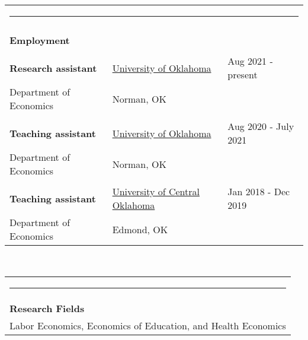 \documentclass[10pt,letterpaper]{article}
\begin{document}
\begin{tabular}{p{2.75in}p{3.05in}p{4.0in}}
\multicolumn{3}{p{7.5in}}{\hrule}\\
\\
{\textbf{\large{Employment}}} & &\\
\\
\textbf{Research assistant} & \href{http://www.ou.edu/}{University of Oklahoma}& Aug 2021 - present\\
Department of Economics      & Norman, OK &\\
\\
\textbf{Teaching assistant} & \href{http://www.ou.edu/}{University of Oklahoma}& Aug 2020 - July 2021\\
Department of Economics      & Norman, OK &\\
\\
\textbf{Teaching assistant} & \href{https://www.uco.edu/}{University of Central Oklahoma}& Jan 2018 - Dec 2019\\
Department of Economics      & Edmond,  OK &\\

\end{tabular} 
\\


\begin{tabular}{p{7.5in}}
\multicolumn{3}{p{7.5in}}{\hrule}\\[1.5ex]
{\textbf{\large{Research Fields}}} \\[1ex]
Labor Economics,  Economics of Education,  and Health Economics
\multicolumn{3}{p{7.5in}}{\hrule}
\end{tabular} 
\end{document}
